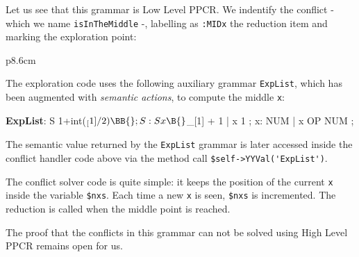 Let us see that this grammar is Low Level PPCR. We indentify the conflict
- which we name \verb|isIn|\verb|TheMiddle| -, labelling as \verb|:MIDx| 
the reduction item and marking the exploration point:

\begin{center}
\begin{tabular}{p{8.6cm}}
\end{tabular}
\end{center}
The exploration code uses the following auxiliary
grammar \verb|ExpList|, which has been augmented with {\it semantic actions},
to compute the middle \verb|x|:
\begin{VERBATIM}
  \textbf{ExpList}: S    \B{} 1+int($_[1]/2) \BB{} ; 
  S:       S x  \B{} $_[1] + 1 \BB{} |  x   \B{} 1 \BB{} ;
  x:       NUM                |  x OP NUM ;
\end{VERBATIM}
The semantic value returned by the \verb|ExpList| grammar is later accessed inside the conflict handler
code above via the method call \verb|$self->YYVal('ExpList')|.

The conflict solver code is quite simple:
it keeps the position of the current \verb|x|
inside the variable \verb|$nxs|. Each time a new \verb|x| is seen,
\verb|$nxs| is incremented.
The reduction is called when the middle point is reached.

The proof that the conflicts in this grammar can not be solved using High Level PPCR
remains open for us.

